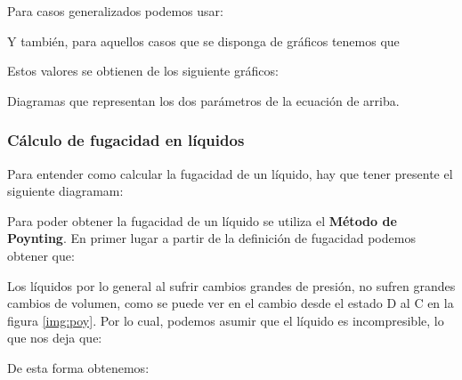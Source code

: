 

Para casos generalizados podemos usar:


Y también, para aquellos casos que se disponga de gráficos tenemos que 


Estos valores se obtienen de los siguiente gráficos:

\begin{images}{Diagramas que representan los dos parámetros de la ecuación de arriba.}
\end{images}

\subsubsection{Cálculo de fugacidad en líquidos}

Para entender como calcular la fugacidad de un líquido, hay que tener presente el siguiente diagramam:


Para poder obtener la fugacidad de un líquido se utiliza el \textbf{Método de Poynting}.
En primer lugar a partir de la definición de fugacidad podemos obtener que:


Los líquidos por lo general al sufrir cambios grandes de presión, no sufren grandes cambios de volumen, como se puede ver en el cambio desde el estado D al C en la figura \ref{img:poy}.
Por lo cual, podemos asumir que el líquido es incompresible, lo que nos deja que:

De esta forma obtenemos:


